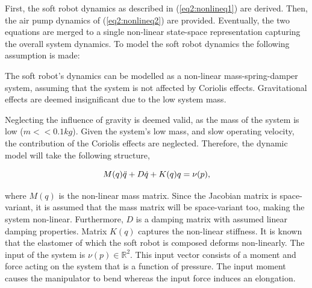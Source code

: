 First, the soft robot dynamics as described in (\ref{eq2:nonlineq1}) are derived. Then, the air pump dynamics of (\ref{eq2:nonlineq2}) are provided. Eventually, the two equations are merged to a single non-linear state-space representation capturing the overall system dynamics. To model the soft robot dynamics the following assumption is made:

\begin{theorem}
The soft robot's dynamics can be modelled as a non-linear mass-spring-damper system, assuming that the system is not affected by Coriolis effects. Gravitational effects are deemed insignificant due to the low system mass.
\end{theorem}

Neglecting the influence of gravity is deemed valid, as the mass of the system is low ($m << 0.1 kg$). Given the system's low mass, and slow operating velocity, the contribution of the Coriolis effects are neglected. Therefore, the dynamic model will take the following structure,


\begin{equation}
    M(q)\Ddot{q} + D\dot{q} + K(q)q = \nu(p),
    \label{eq2:simp_model}
\end{equation}


where $M(q)$ is the non-linear mass matrix. Since the Jacobian matrix is space-variant, it is assumed that the mass matrix will be space-variant too, making the system non-linear. Furthermore, $D$ is a damping matrix with assumed linear damping properties. Matrix $K(q)$ captures the non-linear stiffness. It is known that the elastomer of which the soft robot is composed deforms non-linearly. The input of the system is $\nu(p) \in \mathbb{R}^2$. This input vector consists of a moment and force acting on the system that is a function of pressure. The input moment causes the manipulator to bend whereas the input force induces an elongation.

